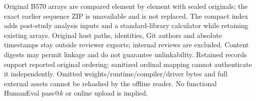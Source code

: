 Original B570 arrays are compared element by element with sealed originals; the exact earlier sequence ZIP is unavailable and is not replaced. The compact index adds post-study analysis inputs and a standard-library calculator while retaining existing arrays. Original host paths, identities, Git authors and absolute timestamps stay outside reviewer exports; internal reviews are excluded. Content digests may permit linkage and do not guarantee unlinkability. Retained records support reported original ordering; sanitized ordinal mapping cannot authenticate it independently. Omitted weights/runtime/compiler/driver bytes and full external assets cannot be rehashed by the offline reader. No functional HumanEval pass@$k$ or online upload is implied.
